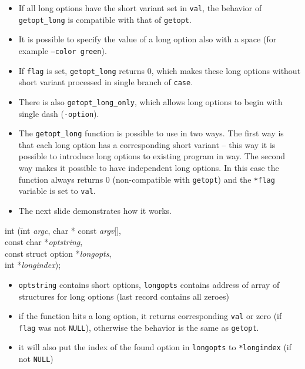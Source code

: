 \begin{itemize}
\item If all long options have the short variant set in \texttt{val}, the
behavior of \texttt{getopt\_long} is compatible with that of \texttt{getopt}.
\item It is possible to specify the value of a long option also with a space
(for example \texttt{--color~green}).
\item If \texttt{flag} is set, \texttt{getopt\_long} returns 0, which makes
these long options without short variant processed in single branch of
\texttt{case}.
\item There is also \texttt{getopt\_long\_only}, which allows long options
to begin with single dash (\texttt{-option}).
\item The \texttt{getopt\_long} function is possible to use in two ways.
The first way is that each long option has a corresponding short variant
-- this way it is possible to introduce long options to existing program
in  way. The second way makes it possible to have
independent long options. In this case the function always returns 0
(non-compatible with \texttt{getopt}) and the \texttt{*flag} variable
is set to \texttt{val}.
\item The next slide demonstrates how it works.
\end{itemize}


\begin{slide}
{\tt\begin{tabbing}
int (\=int \emph{argc}, char * const \emph{argv}[],\\
\>const char *\emph{optstring},\\
\>const struct option *\emph{longopts},\\
\>int *\emph{longindex}); 
\end{tabbing}}
\begin{itemize}
\item \texttt{optstring} contains short options,
\texttt{longopts} contains address of array of structures for long options
(last record contains all zeroes) 
\item if the function hits a long option, it returns corresponding
\texttt{val} or zero (if \texttt{flag} was not \texttt{NULL}),
otherwise the behavior is the same as \texttt{getopt}.
\item it will also put the index of the found option in \texttt{longopts}
to \texttt{*longindex} (if not \texttt{NULL})
\end{itemize}
\end{slide}

